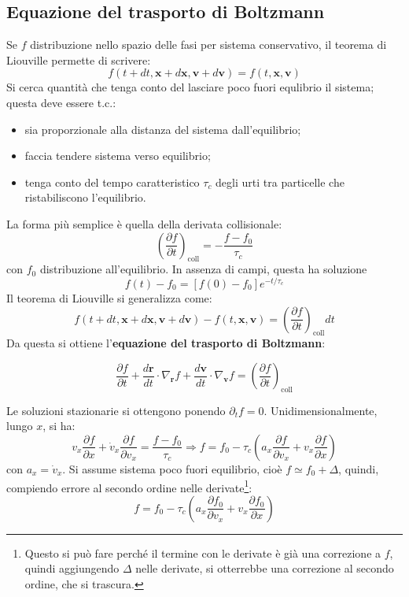 \documentclass[10pt, a4paper]{scrartcl}
\numberwithin{equation}{subsection}
\theoremstyle{style1}
\theoremstyle{style2}
\newenvironment{boxenv}[1][]{
    \begin{eqbox}[#1]
    }{
   \end{eqbox}
}
\begin{document}
\subsection{Equazione del trasporto di Boltzmann}
Se $f$ distribuzione nello spazio delle fasi per sistema conservativo, il teorema di Liouville permette di scrivere:
\[
f(t+ dt , \mathbf{x} + d\mathbf{x} , \mathbf{v} +d \mathbf{v} ) = f(t,\mathbf{x} ,\mathbf{v} )
\] 
Si cerca quantit\`a che tenga conto del lasciare poco fuori equlibrio il sistema; questa deve essere t.c.:
\begin{itemize}
	\item  sia proporzionale alla distanza del sistema dall'equilibrio;
	\item faccia tendere sistema verso equilibrio;
	\item tenga conto del tempo caratteristico $\tau _c$ degli urti tra particelle che ristabiliscono l'equilibrio.
\end{itemize}
La forma pi\`u semplice \`e quella della derivata collisionale:
\begin{equation}
	\left(\frac{\partial f}{\partial t} \right) _\text{coll} = - \frac{f-f_0}{\tau _c}
\end{equation}
con $f_0$ distribuzione all'equilibrio. In assenza di campi, questa ha soluzione
\begin{equation}
	f(t) - f_0 = \left[ f(0) - f_0 \right] e^{-t  / \tau _c} 
\end{equation}
Il teorema di Liouville si generalizza come:
\begin{equation}
	f(t + dt, \mathbf{x} + d\mathbf{x} , \mathbf{v} + d\mathbf{v} ) - f(t, \mathbf{x} , \mathbf{v} ) = \left(\frac{\partial f}{\partial t} \right) _\text{coll} dt
\end{equation}
Da questa si ottiene l'\textbf{equazione del trasporto di Boltzmann}:
\begin{boxenv}[]
\begin{equation}
	\frac{\partial f}{\partial t} + \frac{d \mathbf{r} }{d t} \cdot \nabla _\mathbf{r} f + \frac{d \mathbf{v} }{d t} \cdot \nabla _\mathbf{v} f = \left(\frac{\partial f}{\partial t} \right) _\text{coll}
\end{equation}
\end{boxenv}
\noindent Le soluzioni stazionarie si ottengono ponendo $\partial _t f = 0$.
Unidimensionalmente, lungo $x$, si ha:
\[
v_x \frac{\partial f }{\partial x}  + \dot{v}_x \frac{\partial f}{\partial v_x}  = \frac{f- f_0}{\tau _c}\Rightarrow f = f_0 - \tau _c \left(a_x \frac{\partial f}{\partial v_x} + v_x \frac{\partial f}{\partial x} \right) 
\] 
con $a_x = \dot{v}_x$. Si assume sistema poco fuori equilibrio, cio\`e $f \simeq f_0 + \Delta $, quindi, compiendo errore al secondo ordine nelle derivate\footnote{Questo si pu\`o fare perch\'e il termine con le derivate \`e gi\`a una correzione a $f$, quindi aggiungendo $\Delta $ nelle derivate, si otterrebbe una correzione al secondo ordine, che si trascura.}:
\begin{equation}
	f = f_0 - \tau _c \left(a_x \frac{\partial f_0}{\partial v_x}  + v_x \frac{\partial f_0}{\partial x} \right) 
\end{equation}
\end{document}
